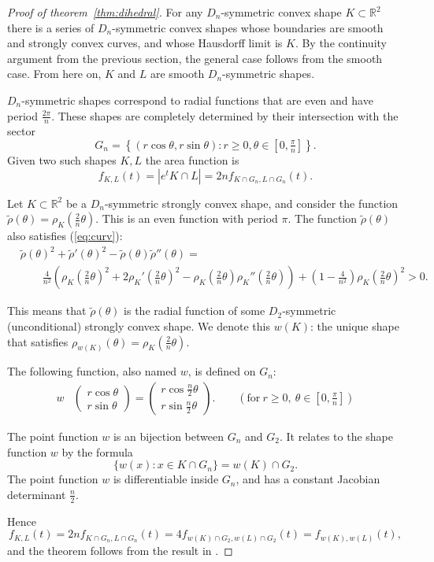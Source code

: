 \documentclass[a4paper,10pt,twoside,reqno,intlimits]{amsart}
\begin{document}
\begin{proof}[Proof of theorem~\ref{thm:dihedral}]

For any $D_n$-symmetric convex shape $K \subset {\mathbb{R}}^2$ there is a series of $D_n$-symmetric convex shapes
whose boundaries are smooth and strongly convex curves, and whose Hausdorff limit is $K$.
By the continuity argument from the previous section, the general case follows from the smooth case.
From here on, $K$ and $L$ are smooth $D_n$-symmetric shapes.

$D_n$-symmetric shapes correspond to radial functions that are even and have period $\frac{2\pi}{n}$.
These shapes are completely determined by their intersection with the sector
$$ G_n = \left\{ (r \cos \theta, r \sin \theta) : r \ge 0 , \theta \in [0,\tfrac{\pi}{n}] \right\} . $$
Given two such shapes $K,L$ the area function is
$$ f_{K,L}(t) = |e^t K \cap L| = 2n f_{K \cap G_n, L \cap G_n}(t) . $$

Let $K \subset {\mathbb{R}}^2$ be a $D_n$-symmetric strongly convex shape, and consider the function
$\tilde{\rho}(\theta) = \rho_K(\frac{2}{n} \theta)$.
This is an even function with period $\pi$.
The function $\tilde{\rho}(\theta)$ also satisfies (\ref{eq:curv}):
\begin{align*}
& \tilde{\rho}(\theta)^2 + \tilde{\rho}'(\theta)^2 - \tilde{\rho}(\theta) \tilde{\rho}''(\theta) = \\
& \qquad \tfrac{4}{n^2} \left( \rho_K(\tfrac{2}{n}\theta)^2 + 2\rho_K'(\tfrac{2}{n}\theta)^2 - \rho_K(\tfrac{2}{n}\theta) \rho_K''(\tfrac{2}{n}\theta) \right) + (1 - \tfrac{4}{n^2}) \rho_K(\tfrac{2}{n}\theta)^2 > 0 .
\end{align*}

This means that $\tilde{\rho}(\theta)$ is the radial function of some $D_2$-symmetric (unconditional)
strongly convex shape.
We denote this $w(K)$: the unique shape that satisfies $\rho_{w(K)}(\theta) = \rho_K(\frac{2}{n} \theta)$.

The following function, also named $w$, is defined on $G_n$:
\begin{align*}
w & \left( \begin{matrix} r \cos \theta \\ r \sin \theta \end{matrix} \right)
= \left( \begin{matrix} r \cos \tfrac{n}{2} \theta \\ r \sin \tfrac{n}{2} \theta \end{matrix} \right) .
\qquad \left( \text{for} \ r \ge 0, \ \theta \in [0,\tfrac{\pi}{n}] \right)
\end{align*}

The point function $w$ is an bijection between $G_n$ and $G_2$.
It relates to the shape function $w$ by the formula
$$ \{ w(x) : x \in K \cap G_n \} = w(K) \cap G_2 . $$
The point function $w$ is differentiable inside $G_n$, and has a constant Jacobian determinant $\frac{n}{2}$.

Hence
$$ f_{K,L}(t) = 2n f_{K \cap G_n,L \cap G_n}(t) = 4 f_{w(K) \cap G_2,w(L) \cap G_2}(t) = f_{w(K),w(L)}(t) , $$
and the theorem follows from the result in \cite{bconj}.

\end{proof}
\end{document}

